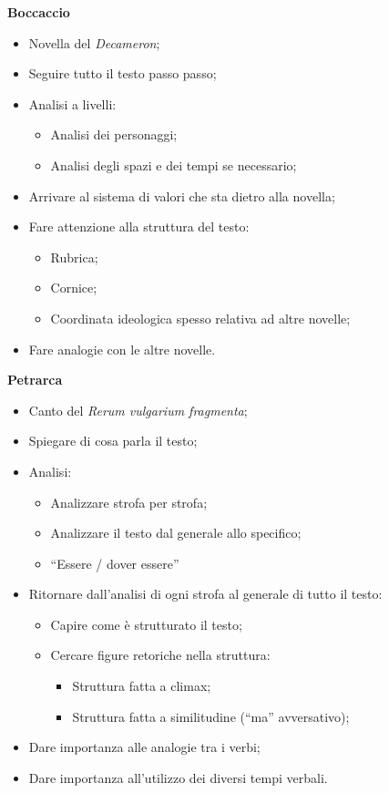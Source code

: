 \documentclass{article}
\begin{document}
\textbf{Boccaccio}
\begin{itemize}
    \item Novella del \textit{Decameron};
    \item Seguire tutto il testo passo passo;
    \item Analisi a livelli:
        \begin{itemize}
            \item Analisi dei personaggi;
            \item Analisi degli spazi e dei tempi se necessario;
        \end{itemize}
    \item Arrivare al sistema di valori che sta dietro alla novella;
    \item Fare attenzione alla struttura del testo:
        \begin{itemize}
            \item Rubrica;
            \item Cornice;
            \item Coordinata ideologica spesso relativa ad altre novelle;
        \end{itemize}
    \item Fare analogie con le altre novelle.
\end{itemize}

\textbf{Petrarca}
\begin{itemize}
    \item Canto del \textit{Rerum vulgarium fragmenta};
    \item Spiegare di cosa parla il testo;
    \item Analisi:
        \begin{itemize}
            \item Analizzare strofa per strofa;
            \item Analizzare il testo dal generale allo specifico;
            \item ``Essere / dover essere'' 
        \end{itemize}
    \item Ritornare dall'analisi di ogni strofa al generale di tutto il testo:
        \begin{itemize}
            \item Capire come è strutturato il testo;
            \item Cercare figure retoriche nella struttura:
                \begin{itemize}
                    \item Struttura fatta a climax;
                    \item Struttura fatta a similitudine (``ma'' avversativo);
                \end{itemize}
        \end{itemize}
    \item Dare importanza alle analogie tra i verbi;
    \item Dare importanza all'utilizzo dei diversi tempi verbali.
\end{itemize}
\end{document}
